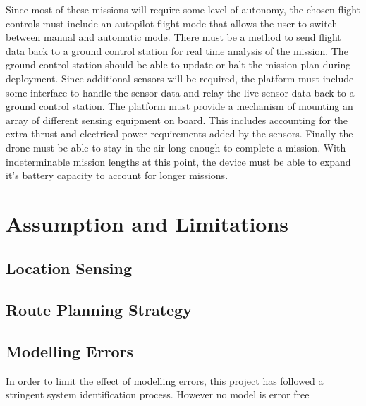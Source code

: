 		Since most of these missions will require some level of autonomy, the chosen flight controls must include an autopilot flight mode that allows the user to switch between manual and automatic mode. There must be a method to send flight data back to a ground control station for real time analysis of the mission. The ground control station should be able to update or halt the mission plan during deployment. Since additional sensors will be required, the platform must include some interface to handle the sensor data and relay the live sensor data back to a ground control station. The platform must provide a mechanism of mounting an array of different sensing equipment on board. This includes accounting for the extra thrust and electrical power requirements added by the sensors. Finally the drone must be able to stay in the air long enough to complete a mission. With indeterminable mission lengths at this point, the device must be able to expand it's battery capacity to account for longer missions.
	
	\section{Assumption and Limitations}
		\subsection{Location Sensing}
		\subsection{Route Planning Strategy}
		\subsection{Modelling Errors}
		In order to limit the effect of modelling errors, this project has followed a stringent system identification process. However no model is error free  
